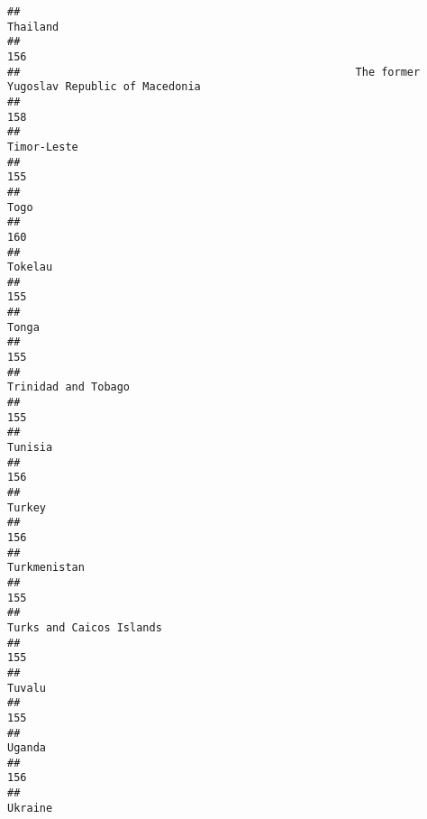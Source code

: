 \documentclass[]{article}
\begin{document}
\begin{verbatim}
##                                                                                     Thailand 
##                                                                                          156 
##                                                    The former Yugoslav Republic of Macedonia 
##                                                                                          158 
##                                                                                  Timor-Leste 
##                                                                                          155 
##                                                                                         Togo 
##                                                                                          160 
##                                                                                      Tokelau 
##                                                                                          155 
##                                                                                        Tonga 
##                                                                                          155 
##                                                                          Trinidad and Tobago 
##                                                                                          155 
##                                                                                      Tunisia 
##                                                                                          156 
##                                                                                       Turkey 
##                                                                                          156 
##                                                                                 Turkmenistan 
##                                                                                          155 
##                                                                     Turks and Caicos Islands 
##                                                                                          155 
##                                                                                       Tuvalu 
##                                                                                          155 
##                                                                                       Uganda 
##                                                                                          156 
##                                                                                      Ukraine 

\end{verbatim}
\end{document}
